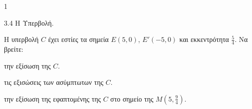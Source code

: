\begin{ylh}{1}
    \item 3.4 Η Υπερβολή.
\end{ylh}
Η υπερβολή $C$ έχει εστίες τα σημεία $E(5,0)$, $E'(-5,0)$ και εκκεντρότητα $\frac{5}{4}$. Να βρείτε:
\begin{alist}
    \item την εξίσωση της $C$. 
    \item τις εξισώσεις των ασύμπτωτων της $C$. 
    \item την εξίσωση της εφαπτομένης της $C$ στο σημείο της $M\left(5, \frac{9}{4}\right)$. 
\end{alist}